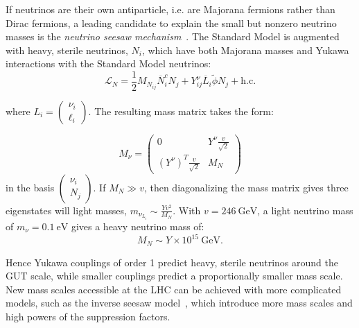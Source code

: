If neutrinos are their own antiparticle, i.e. are Majorana fermions rather than Dirac fermions, a leading candidate to explain the small but nonzero neutrino masses is the \emph{neutrino seesaw mechanism}~\cite{Mohapatra:1980yp,GellMann:1980vs,Yanagida:1980xy}. The Standard Model is augmented with heavy, sterile neutrinos, $N_i$, which have both Majorana masses and Yukawa interactions with the Standard Model neutrinos:
\begin{equation}
	\mathcal{L}_N = \frac12 M_{N_{ij}} \overline{N}^c_i N_j + Y_{ij}^{\nu} \overline{L}_{i} \tilde{\phi} N_{j} + \mathrm{h.c.}
\end{equation}

where $L_i = \left(\begin{array}{c}\nu_i \\ \ell_i \end{array}\right)$. The resulting mass matrix takes the form:

\begin{equation}
	M_{\nu} = \left(\begin{array}{cc} 0 & Y^{\nu} \frac{v}{\sqrt{2}} \\ (Y^{\nu})^T \frac{v}{\sqrt{2}} & M_N \end{array}\right)
\end{equation}
in the basis $\left(\begin{array}{c} \nu_{i} \\ N_j \end{array} \right)$. If $M_N \gg v$, then diagonalizing the mass matrix gives three eigenstates will light masses, $m_{\nu_{L_i}} \sim  \frac{Yv^2}{M_N}$. With $v=246~\mbox{GeV}$, a light neutrino mass of $m_{\nu}=0.1~\mbox{eV}$ gives a heavy neutrino mass of:
\begin{equation}
	M_N \sim Y \times 10^{15}~\mbox{GeV}.
\end{equation}

Hence Yukawa couplings of order 1 predict heavy, sterile neutrinos around the GUT scale, while smaller couplings predict a proportionally smaller mass scale. New mass scales accessible at the LHC can be achieved with more complicated models, such as the inverse seesaw model~\cite{Deppisch:2005ky}, which introduce more mass scales and high powers of the suppression factors.

